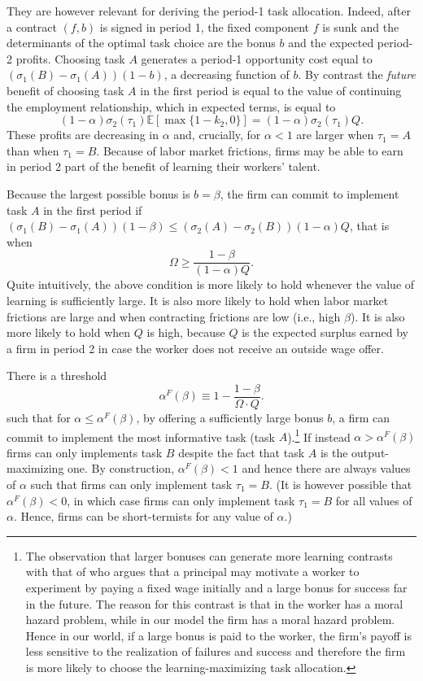 \documentclass[12pt,american]{paper}
\theoremstyle{remark}
\begin{document}
They are however relevant for deriving the period-1 task allocation. Indeed, after a contract $(f,b)$  is signed in period 1, the fixed component $f$ is sunk and the determinants of the optimal task choice are the bonus $b$ and the expected period-2 profits. Choosing task $A$ generates a period-1 opportunity cost equal to $( \sigma_1(B)- \sigma_1(A))(1-b)$, a decreasing function of $b$. By contrast the \textit{future} benefit of choosing task $A$ in the first period is equal to the value of continuing the employment relationship, which in expected terms, is equal to 
\[(1- \alpha) \sigma_2(\tau_1) \mathbb E[\max \{1-k_2,0\}]=(1-\alpha) \sigma_2(\tau_1) Q.\]
%
These profits are decreasing in $\alpha$ and, crucially, for $\alpha<1$ are larger when $\tau_1=A$ than when $\tau_1=B$. Because of labor market frictions, firms may be able to earn  in period 2 part of the benefit of learning their workers' talent. 

Because the largest possible bonus  is $b=\beta$,  the firm can commit to implement task $A$ in the first period if $( \sigma_1(B)- \sigma_1(A))(1-\beta) \leq(\sigma_2(A)-\sigma_2(B))(1-\alpha) Q $, that is when
%
\begin{equation}\label{eq: commitment}
\Omega \geq \frac{1-\beta}{(1-\alpha)Q}.
\end{equation}
Quite intuitively, the above condition is more likely to hold whenever the value of learning is sufficiently large. It is also more likely to hold when labor market frictions are large and when contracting frictions are low (i.e., high $\beta$). It is also more likely to hold when $Q$ is high, because $Q$ is the expected surplus earned by a firm in period 2 in case the worker does not receive an outside wage offer.

There is a threshold
\[
\alpha^F(\beta) \equiv 1- \frac{1-\beta}{\Omega \cdot Q}.
\]
such that for $\alpha \leq \alpha^F(\beta)$, by offering a sufficiently large bonus $b$,  a firm can commit to  implement the most informative task (task $A$).\footnote{ The observation that larger bonuses can generate more learning contrasts with that of \citet{manso2011motivating} who argues that a principal may motivate a worker to experiment by paying a fixed wage initially and a large bonus for success far in the future. The reason for this contrast is that in \cite{manso2011motivating} the worker has a moral hazard problem, while in our model the firm has a moral hazard problem. Hence in our world, if a large bonus is paid to the worker, the firm's payoff is less sensitive to the realization of failures and success and therefore the firm is more likely to choose the learning-maximizing task allocation.} If instead  $\alpha > \alpha^F(\beta)$  firms can only implements task $B$ despite the fact that task $A$ is the output-maximizing one. By construction, $\alpha^F(\beta) <1$ and hence there are always values of $\alpha$ such that firms can only implement task $\tau_1=B$. (It is however possible that $\alpha^F(\beta) <0$, in which case firms can only implement task $\tau_1=B$ for all values of $\alpha$. Hence, firms can be short-termists for any value of $\alpha$.)
\end{document}
